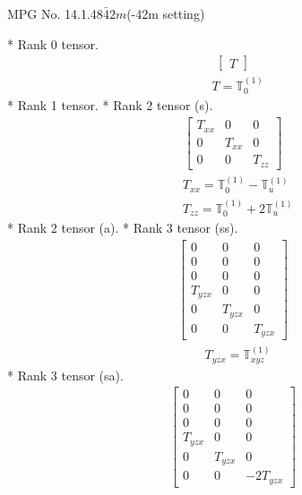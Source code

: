 \documentclass[fleqn,8pt,landscape]{jsarticle}
\begin{document}
\setcounter{MaxMatrixCols}{32}

\renewcommand{\tablename}{Table~}
\renewcommand{\figurename}{Figure~}
\begin{center}
\LARGE
MPG No. 14.1.48\quad$\bar{4}2m$\quad(-42m setting)
\end{center}
* Rank 0 tensor.
\begin{align*}
\begin{bmatrix} T \end{bmatrix}
\end{align*}
\begin{align*}
& T = \mathbb{T}_{0}^{(1)}
\end{align*}
* Rank 1 tensor.
* Rank 2 tensor (s).
\begin{align*}
\begin{bmatrix} T_{xx} & 0 & 0 \\ 0 & T_{xx} & 0 \\ 0 & 0 & T_{zz} \end{bmatrix}
\end{align*}
\begin{align*}
& T_{xx} = \mathbb{T}_{0}^{(1)} - \mathbb{T}_{u}^{(1)} \\
& T_{zz} = \mathbb{T}_{0}^{(1)} + 2 \mathbb{T}_{u}^{(1)}
\end{align*}
* Rank 2 tensor (a).
* Rank 3 tensor (ss).
\begin{align*}
\begin{bmatrix} 0 & 0 & 0 \\ 0 & 0 & 0 \\ 0 & 0 & 0 \\ T_{yzx} & 0 & 0 \\ 0 & T_{yzx} & 0 \\ 0 & 0 & T_{yzx} \end{bmatrix}
\end{align*}
\begin{align*}
& T_{yzx} = \mathbb{T}_{xyz}^{(1)}
\end{align*}
* Rank 3 tensor (sa).
\begin{align*}
\begin{bmatrix} 0 & 0 & 0 \\ 0 & 0 & 0 \\ 0 & 0 & 0 \\ T_{yzx} & 0 & 0 \\ 0 & T_{yzx} & 0 \\ 0 & 0 & - 2 T_{yzx} \end{bmatrix}
\end{align*}
\end{document}
